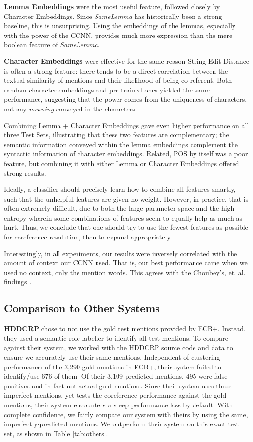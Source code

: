 \documentclass[11pt,a4paper]{article}
\begin{document}
\textbf{Lemma Embeddings} were the most useful feature, followed closely by Character Embeddings.  Since \textit{SameLemma} has historically been a strong baseline, this is unsurprising.  Using the embeddings of the lemmas, especially with the power of the CCNN, provides much more expression than the mere boolean feature of \textit{SameLemma}.

\textbf{Character Embeddings} were effective for the same reason String Edit Distance is often a strong feature: there tends to be a direct correlation between the textual similarity of mentions and their likelihood of being co-referent. Both random character embeddings and pre-trained ones yielded the same performance, suggesting that the power comes from the uniqueness of characters, not any \textit{meaning} conveyed in the characters.

Combining Lemma + Character Embeddings gave even higher performance on all three Test Sets, illustrating that these two features are complementary; the semantic information conveyed within the lemma embeddings complement the syntactic information of character embeddings.  Related, POS by itself was a poor feature, but combining it with either Lemma or Character Embeddings offered strong results. 

Ideally, a classifier should precisely learn how to combine all features smartly, such that the unhelpful features are given no weight.  However, in practice, that is often extremely difficult, due to both the large parameter space and the high entropy wherein some combinations of features seem to equally help as much as hurt.  Thus, we conclude that one should try to use the fewest features as possible for coreference resolution, then to expand appropriately.

Interestingly, in all experiments, our results were inversely correlated with the amount of context our CCNN used.  That is, our best performance came when we used no context, only the mention words.  This agrees with the Choubey's, et. al. findings .

\subsection{Comparison to Other Systems}
\textbf{HDDCRP} chose to not use the gold test mentions provided by ECB+.  Instead, they used a semantic role labeller to identify all test mentions.
To compare against their system, we worked with the HDDCRP source code and data to ensure we accurately use their same mentions.  Independent of clustering performance: of the 3,290 gold mentions in ECB+, their system failed to identify/use 676 of them.  Of their 3,109 predicted mentions, 495 were false positives and in fact not actual gold mentions.  Since their system uses these imperfect mentions, yet tests the coreference performance against the gold mentions, their system encounters a steep performance loss by default.  With complete confidence, we fairly compare our system with theirs by using the same, imperfectly-predicted mentions.  We outperform their system on this exact test set, as shown in Table \ref{tab:others}.
\end{document}
